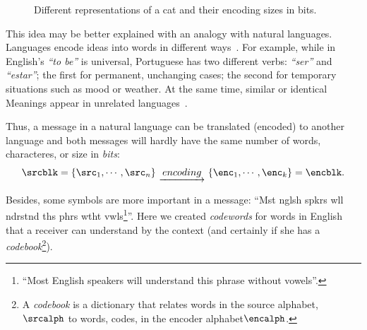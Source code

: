 	\begin{figure}[hbt!]
		\centering
\caption{Different representations of a cat and their encoding sizes in bits.}
\end{figure}




This idea may be better explained with an analogy with natural languages. Languages encode ideas into words in different ways~\cite{zaslavsky:2018}. For example, while in English's \emph{``to be''} is universal, Portuguese has two different verbs: \emph{``ser''} and \emph{``estar''}; the first for permanent, unchanging cases; the second for temporary situations such as mood or weather. At the same time, similar or identical
Meanings appear in unrelated languages~\cite{zaslavsky:2018}.

Thus, a message in a natural language can be translated (encoded) to another language and both messages will hardly have the same number of words, characteres, or size in \emph{bits}:
\begin{align}
	\srcblk=\{\src_1, \cdots, \src_n\}&~\underrightarrow{~encoding~}~
	\{\enc_1,  \cdots, \enc_k\}=\encblk.\\
\end{align}

Besides, some symbols are more important in a message: ``Mst nglsh spkrs wll ndrstnd ths phrs wtht vwls\footnote{``Most English speakers will understand this phrase without vowels''.}''. Here we created \emph{codewords} for words in English that a receiver can understand by the context (and certainly if she has a \emph{codebook}\footnote{A \emph{codebook} is a dictionary that relates words in the source alphabet, \(\srcalph\) to words, codes, in the encoder alphabet\(\encalph\).}).


